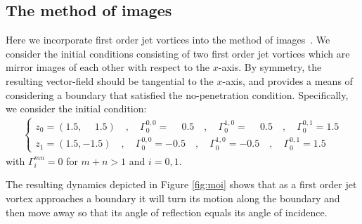 \documentclass[12pt]{amsart}
\theoremstyle{remark}
\begin{document}
\subsection{The method of images}
\label{sec:method_of_images}
Here we incorporate first order jet vortices into the method of images~\cite{Jackson1975}.
We consider the initial conditions consisting of two first order jet vortices which are mirror images of each other with respect to the $x$-axis.
By symmetry, the resulting vector-field should be tangential to the $x$-axis, and provides a means of considering a boundary that satisfied the no-penetration condition.
Specifically, we consider the initial condition:
\begin{align}
	\begin{cases}
	z_0 = (1.5 , \phantom{-}1.5)\quad, \quad \Gamma_0^{0,0} = \phantom{-}0.5 \quad,\quad \Gamma_0^{1,0} = \phantom{-}0.5 \quad,\quad \Gamma_0^{0,1} = 1.5 \\
	z_1 = (1.5,-1.5)\quad, \quad \Gamma_0^{0,0} = -0.5 \quad,\quad \Gamma_0^{1,0} = -0.5 \quad,\quad \Gamma_0^{0,1} =1.5
	\end{cases}
	\label{eq:ic moi}
\end{align}
with $\Gamma_i^{mn} = 0$ for $m+n > 1$ and $i=0,1$.

The resulting dynamics depicted in Figure \ref{fig:moi} shows that as a first order jet vortex approaches a boundary it will turn its motion along the boundary and then move away so that its angle of reflection equals its angle of incidence. 
\end{document}
